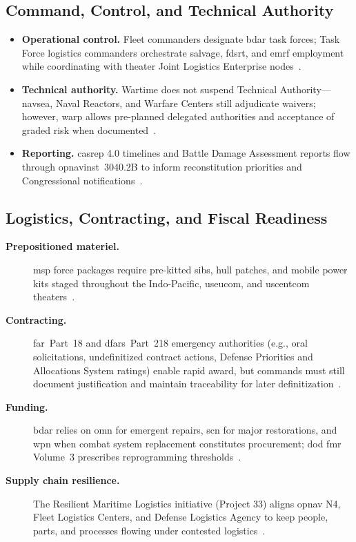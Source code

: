 \documentclass[../main.tex]{subfiles}
\begin{document}
\subsection{Command, Control, and Technical Authority}
\begin{itemize}
\item \textbf{Operational control.} Fleet commanders designate \ac{bdar} task forces; Task Force logistics commanders orchestrate salvage, \ac{fdsrt}, and \ac{emrf} employment while coordinating with theater Joint Logistics Enterprise nodes~\autocite{NWP3-32,NWP4-12}.
\item \textbf{Technical authority.} Wartime does not suspend Technical Authority—\ac{navsea}, Naval Reactors, and Warfare Centers still adjudicate waivers; however, \ac{warp} allows pre-planned delegated authorities and acceptance of graded risk when documented~\autocite{SECNAV-WARP-2021}.
  \item \textbf{Reporting.} \ac{casrep} 4.0 timelines and Battle Damage Assessment reports flow through \ac{opnavinst}~3040.2B to inform reconstitution priorities and Congressional notifications~\autocite{OPNAVINST3040-2B}.
\end{itemize}

\subsection{Logistics, Contracting, and Fiscal Readiness}
\begin{description}
  \item[\textbf{Prepositioned materiel.}] \ac{msp} force packages require pre-kitted \acp{sib}, hull patches, and mobile power kits staged throughout the Indo-Pacific, \ac{useucom}, and \ac{uscentcom} theaters~\autocite{CPF-MSP-PLANORD-2023}.
  \item[\textbf{Contracting.}] \ac{far}~Part~18 and \ac{dfars}~Part~218 emergency authorities (e.g., oral solicitations, undefinitized contract actions, Defense Priorities and Allocations System ratings) enable rapid award, but commands must still document justification and maintain traceability for later definitization~\autocite{FAR,DFARS}.
  \item[\textbf{Funding.}] \ac{bdar} relies on \ac{omn} for emergent repairs, \ac{scn} for major restorations, and \ac{wpn} when combat system replacement constitutes procurement; \ac{dod} \ac{fmr} Volume~3 prescribes reprogramming thresholds~\autocite{DoDFMR-Vol3}.
  \item[\textbf{Supply chain resilience.}] The Resilient Maritime Logistics initiative (Project 33) aligns \ac{opnav} N4, Fleet Logistics Centers, and Defense Logistics Agency to keep people, parts, and processes flowing under contested logistics~\autocite{NAVPLAN2024,edo-4-1-6-bdar-2025}.
\end{description}
\end{document}
